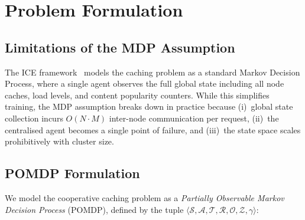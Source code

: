 \documentclass[conference]{IEEEtran}
\begin{document}
\section{Problem Formulation}
\label{sec:pomdp}

\subsection{Limitations of the MDP Assumption}

The ICE framework~\cite{ice2022} models the caching problem as a
standard Markov Decision Process, where a single agent observes the
full global state including all node caches, load levels, and
content popularity counters.  While this simplifies training, the MDP
assumption breaks down in practice because (i)~global state collection
incurs $O(N \cdot M)$ inter-node communication per request, (ii)~the
centralised agent becomes a single point of failure, and (iii)~the
state space scales prohibitively with cluster size.

\subsection{POMDP Formulation}

We model the cooperative caching problem as a \emph{Partially
Observable Markov Decision Process} (POMDP), defined by the tuple
$\langle \mathcal{S}, \mathcal{A}, \mathcal{T}, \mathcal{R},
\mathcal{O}, \mathcal{Z}, \gamma \rangle$:
\end{document}

